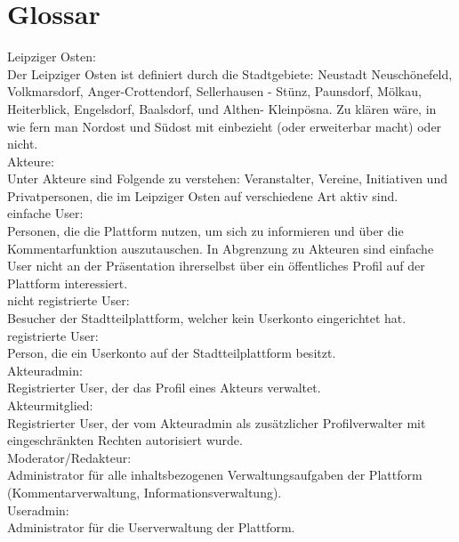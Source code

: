 \documentclass{swp}
\begin{document}
\section{Glossar}
Leipziger Osten:\\Der Leipziger Osten ist definiert durch die Stadtgebiete: Neustadt Neusch\"onefeld, Volkmarsdorf, Anger-Crottendorf, Sellerhausen - St\"unz, Paunsdorf, M\"olkau, Heiterblick, Engelsdorf, Baalsdorf, und Althen- Kleinp\"osna. Zu kl\"aren w\"are, in wie fern man Nordost und S\"udost mit einbezieht (oder erweiterbar macht) oder nicht.\\

Akteure: \\Unter Akteure sind Folgende zu verstehen: Veranstalter, Vereine, Initiativen und Privatpersonen, die im Leipziger Osten auf verschiedene Art aktiv sind.\\

einfache User:\\Personen, die die Plattform nutzen, um sich zu informieren und \"uber die Kommentarfunktion auszutauschen. In Abgrenzung zu Akteuren sind einfache User nicht an der Pr\"asentation ihrerselbst \"uber ein \"offentliches Profil auf der Plattform interessiert.\\

nicht registrierte User:\\Besucher der Stadtteilplattform, welcher kein Userkonto eingerichtet hat.\\

registrierte User:\\Person, die ein Userkonto auf der Stadtteilplattform besitzt.\\

Akteuradmin:\\Registrierter User, der das Profil eines Akteurs verwaltet.\\

Akteurmitglied:\\Registrierter User, der vom Akteuradmin als zus\"atzlicher Profilverwalter mit eingeschr\"ankten Rechten autorisiert wurde.\\

Moderator/Redakteur:\\Administrator f\"ur alle inhaltsbezogenen Verwaltungsaufgaben der Plattform (Kommentarverwaltung, Informationsverwaltung).\\

Useradmin:\\Administrator f\"ur die Userverwaltung der Plattform.\\
\end{document}
